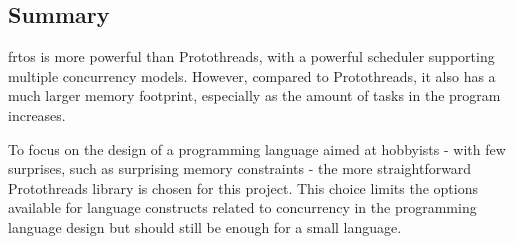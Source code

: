 \subsection{Summary}\label{subsec:concurrencysummary}
\gls{frtos} is more powerful than Protothreads, with a powerful scheduler supporting multiple concurrency models. However, compared to Protothreads, it also has a much larger memory footprint, especially as the amount of tasks in the program increases.

To focus on the design of a programming language aimed at hobbyists - with few surprises, such as surprising memory constraints - the more straightforward Protothreads library is chosen for this project. This choice limits the options available for language constructs related to concurrency in the programming language design but should still be enough for a small language.